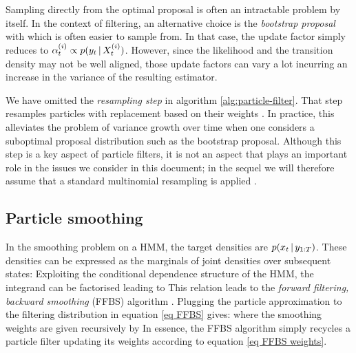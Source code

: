 Sampling directly from the optimal proposal is often an intractable problem by itself. In the context of filtering, an alternative choice is the \emph{bootstrap proposal} \citep{doucet11} with
which is often easier to sample from. In that case, the update factor simply reduces to $\alpha^{(i)}_t \propto p(y_t\,|\, X^{(i)}_t)$. However, since the likelihood and the transition density may not be well aligned, those update factors can vary a lot incurring an increase in the variance of the resulting estimator.

We have omitted the \emph{resampling step} in algorithm \ref{alg:particle-filter}. That step resamples particles with replacement based on their weights \citep{delmoral06}. In practice, this alleviates the problem of variance growth over time when one considers a suboptimal proposal distribution such as the bootstrap proposal. Although this step is a key aspect of particle filters, it is not an aspect that plays an important role in the issues we consider in this document; in the sequel we will therefore assume that a standard multinomial resampling is applied \citep{doucet11}.

\subsection{\label{bg:particle-smoothing}Particle smoothing}

In the smoothing problem on a HMM, the target densities are $p(x_t\,|\, y_{1:T})$. These densities can be expressed as the marginals of joint densities over subsequent states: 
 Exploiting the conditional dependence structure of the HMM, the integrand can be factorised leading to
This relation leads to the \emph{forward filtering, backward smoothing} (FFBS) algorithm \citep{hurzeler98, doucet00}.
Plugging the particle approximation to the filtering distribution in equation \eqref{eq FFBS} gives:
where the smoothing weights are given recursively by
In essence, the FFBS algorithm simply recycles a particle filter updating its weights according to equation \eqref{eq FFBS weights}. 

